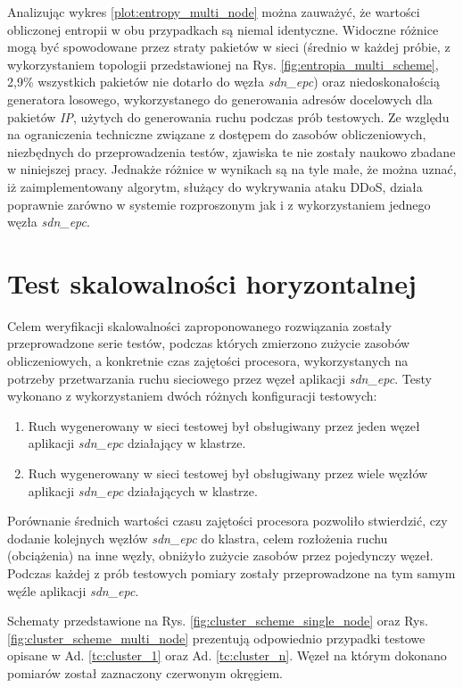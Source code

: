Analizując wykres \ref{plot:entropy_multi_node} można zauważyć, że wartości
obliczonej entropii w obu przypadkach są niemal identyczne. Widoczne różnice
mogą być spowodowane przez straty pakietów w sieci (średnio w każdej próbie, z
wykorzystaniem topologii przedstawionej na Rys. \ref{fig:entropia_multi_scheme},
2,9\% wszystkich pakietów nie dotarło do węzła \textit{sdn\_epc}) oraz
niedoskonałością generatora losowego, wykorzystanego do generowania adresów
docelowych dla pakietów \textit{IP}, użytych do generowania ruchu podczas prób
testowych. Ze względu na ograniczenia techniczne związane z dostępem do zasobów
obliczeniowych, niezbędnych do przeprowadzenia testów, zjawiska te nie zostały
naukowo zbadane w niniejszej pracy. Jednakże różnice w wynikach są  na tyle
małe, że można uznać, iż zaimplementowany algorytm, służący do wykrywania ataku
DDoS, działa poprawnie zarówno w systemie rozproszonym jak i z wykorzystaniem
jednego węzła \textit{sdn\_epc}.

\section{Test skalowalności horyzontalnej}

Celem weryfikacji skalowalności zaproponowanego rozwiązania zostały
przeprowadzone serie testów, podczas których zmierzono zużycie zasobów
obliczeniowych, a konkretnie czas zajętości procesora, wykorzystanych na
potrzeby przetwarzania ruchu sieciowego przez węzeł aplikacji \textit{sdn\_epc}.
Testy wykonano z wykorzystaniem dwóch różnych konfiguracji testowych:
\begin{enumerate}
  \item \label{tc:cluster_1} Ruch wygenerowany w sieci testowej był obsługiwany
    przez jeden węzeł aplikacji \textit{sdn\_epc} działający w klastrze.
  \item \label{tc:cluster_n} Ruch wygenerowany w sieci testowej był obsługiwany
    przez wiele węzłów aplikacji \textit{sdn\_epc} działających w klastrze.
\end{enumerate}

Porównanie średnich wartości czasu zajętości procesora pozwoliło stwierdzić,
czy dodanie kolejnych węzłów \textit{sdn\_epc} do klastra, celem rozłożenia
ruchu (obciążenia) na inne węzły, obniżyło zużycie zasobów przez pojedynczy
węzeł. Podczas każdej z prób testowych pomiary zostały przeprowadzone na tym
samym węźle aplikacji \textit{sdn\_epc}.

Schematy przedstawione na Rys. \ref{fig:cluster_scheme_single_node} oraz
Rys. \ref{fig:cluster_scheme_multi_node} prezentują odpowiednio przypadki
testowe opisane w Ad. \ref{tc:cluster_1} oraz Ad. \ref{tc:cluster_n}. Węzeł
na którym dokonano pomiarów został zaznaczony czerwonym okręgiem.
\newpage

